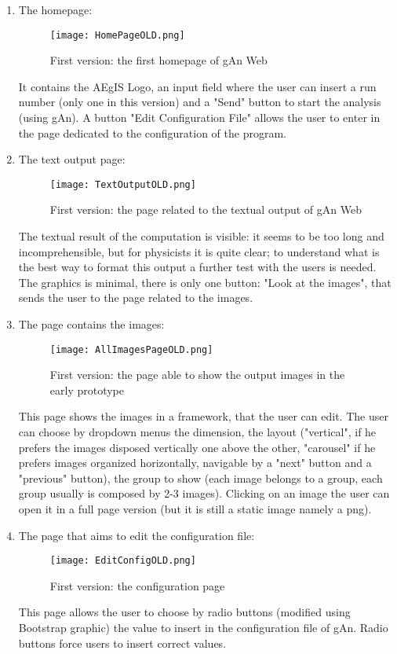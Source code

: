 \begin{enumerate}
\item The homepage:

\begin{figure}[H]
\centering
\texttt{[image: HomePageOLD.png]} 
\caption{First version: the first homepage of gAn Web}
\end{figure}

It contains the AEgIS Logo, an input field where the user can insert a run number (only one in this version) and a "Send" button to start the analysis (using gAn). A button "Edit Configuration File" allows the user to  enter in the page dedicated to the configuration of the program.

\item The text output page:

\begin{figure}[H]
\centering
\texttt{[image: TextOutputOLD.png]} 
\caption{First version: the page related to the textual output of gAn Web}
\end{figure}
  
The textual result of the computation is visible: it seems to be too long and incomprehensible, but for physicists it is quite clear; to understand what is the best way to format this output a further test with the users is needed. The graphics is minimal, there is only one button: "Look at the images", that sends the user to the page related to the images. 



\item The page contains the images:

\begin{figure}[H]
\centering
\texttt{[image: AllImagesPageOLD.png]}
\caption{First version: the page able to show the output images in the early prototype}
\end{figure}   

This page shows the images in a framework, that the user can edit.
The user can choose by dropdown menus the dimension, the layout ("vertical", if he prefers the images disposed vertically one above the other, "carousel" if he prefers images organized horizontally, navigable by a "next" button and a "previous" button), the group to show (each image belongs to a group, each group usually is composed by 2-3 images). Clicking on an image the user can open it in a full page version (but it is still a static image namely a png).


\item The page that aims to edit the configuration file:

\begin{figure}[H]
\centering
\texttt{[image: EditConfigOLD.png]}  
\caption{First version: the configuration page}
\end{figure}   

This page allows the user to choose by radio buttons (modified using Bootstrap graphic) the value to insert in the configuration file of gAn. Radio buttons force users to insert correct values.    

\end{enumerate}

